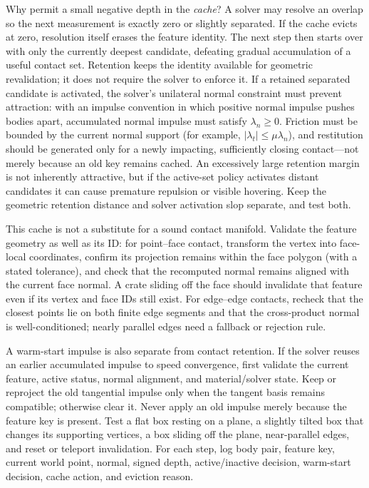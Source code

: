 Why permit a small negative depth in the \emph{cache}? A solver may resolve an overlap so the next measurement is exactly zero or slightly separated. If the cache evicts at zero, resolution itself erases the feature identity. The next step then starts over with only the currently deepest candidate, defeating gradual accumulation of a useful contact set. Retention keeps the identity available for geometric revalidation; it does not require the solver to enforce it. If a retained separated candidate is activated, the solver's unilateral normal constraint must prevent attraction: with an impulse convention in which positive normal impulse pushes bodies apart, accumulated normal impulse must satisfy \(\lambda_n\geq0\). Friction must be bounded by the current normal support (for example, \(|\lambda_t|\leq\mu\lambda_n\)), and restitution should be generated only for a newly impacting, sufficiently closing contact---not merely because an old key remains cached. An excessively large retention margin is not inherently attractive, but if the active-set policy activates distant candidates it can cause premature repulsion or visible hovering. Keep the geometric retention distance and solver activation slop separate, and test both.

This cache is not a substitute for a sound contact manifold. Validate the feature geometry as well as its ID: for point--face contact, transform the vertex into face-local coordinates, confirm its projection remains within the face polygon (with a stated tolerance), and check that the recomputed normal remains aligned with the current face normal. A crate sliding off the face should invalidate that feature even if its vertex and face IDs still exist. For edge--edge contacts, recheck that the closest points lie on both finite edge segments and that the cross-product normal is well-conditioned; nearly parallel edges need a fallback or rejection rule.

A warm-start impulse is also separate from contact retention. If the solver reuses an earlier accumulated impulse to speed convergence, first validate the current feature, active status, normal alignment, and material/solver state. Keep or reproject the old tangential impulse only when the tangent basis remains compatible; otherwise clear it. Never apply an old impulse merely because the feature key is present. Test a flat box resting on a plane, a slightly tilted box that changes its supporting vertices, a box sliding off the plane, near-parallel edges, and reset or teleport invalidation. For each step, log body pair, feature key, current world point, normal, signed depth, active/inactive decision, warm-start decision, cache action, and eviction reason.

